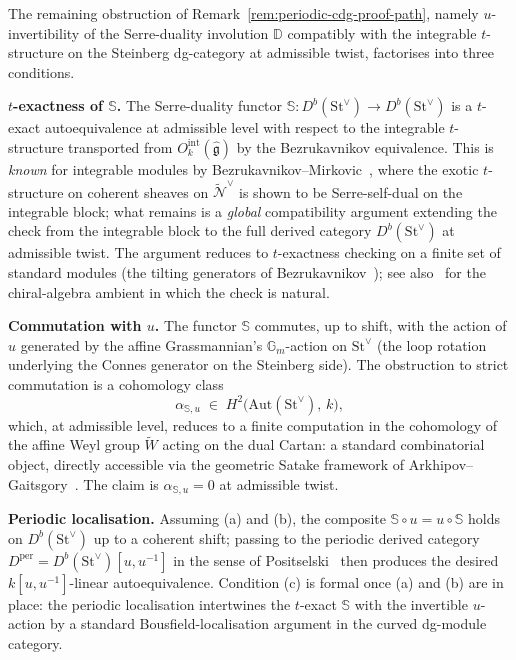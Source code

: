 \begin{remark}
\label{rem:serre-duality-u-invertibility-decomposition}
%
%
The remaining obstruction of
Remark~\textup{\ref{rem:periodic-cdg-proof-path}}, namely $u$-invertibility
of the Serre-duality involution $\mathbb{D}$ compatibly with the
integrable $t$-structure on the Steinberg dg-category at admissible
twist, factorises into three conditions.

\medskip
\noindent\textbf{\(t\)-exactness of \(\mathbb{S}\).}
The Serre-duality functor
$\mathbb{S} \colon D^b(\mathrm{St}^\vee) \to D^b(\mathrm{St}^\vee)$
is a $t$-exact autoequivalence at admissible level with respect to
the integrable $t$-structure transported from
$O^{\mathrm{int}}_k(\widehat{\mathfrak{g}})$ by the Bezrukavnikov
equivalence. This is
\emph{known} for integrable modules by
Bezrukavnikov--Mirkovic~\cite{Bezrukavnikov16}, where the
exotic $t$-structure on coherent sheaves on
$\widetilde{\mathcal{N}}^\vee$ is shown to be Serre-self-dual on the
integrable block; what remains is a \emph{global} compatibility
argument extending the check from the integrable block to the full
derived category $D^b(\mathrm{St}^\vee)$ at admissible twist. The
argument reduces to $t$-exactness checking on a finite set of
standard modules (the tilting generators of
Bezrukavnikov~\cite{Bezrukavnikov16}); see also~\cite{BD04} for the
chiral-algebra ambient in which the check is natural.

\medskip
\noindent\textbf{Commutation with \(u\).}
The functor $\mathbb{S}$ commutes, up to shift, with the action of
$u$ generated by the affine Grassmannian's $\mathbb{G}_m$-action on
$\mathrm{St}^\vee$ (the loop rotation underlying the Connes
generator on the Steinberg side). The obstruction to strict commutation is a
cohomology class
\[
\alpha_{\mathbb{S},u} \;\in\;
H^2\!\bigl(\mathrm{Aut}(\mathrm{St}^\vee),\,k\bigr),
\]
which, at admissible level, reduces to a finite computation in the
cohomology of the affine Weyl group $\widetilde{W}$ acting on the
dual Cartan: a standard combinatorial object, directly accessible
via the geometric Satake framework of
Arkhipov--Gaitsgory~\cite{ArkhipovGaitsgory09}. The claim is
$\alpha_{\mathbb{S},u} = 0$ at admissible twist.

\medskip
\noindent\textbf{Periodic localisation.}
Assuming (a) and (b), the composite $\mathbb{S}\circ u = u\circ\mathbb{S}$
holds on $D^b(\mathrm{St}^\vee)$ up to a coherent shift; passing to
the periodic derived category
$D^{\mathrm{per}} = D^b(\mathrm{St}^\vee)[u,u^{-1}]$ in the sense of
Positselski~\cite{Positselski11,Positselski18} then produces the
desired $k[u,u^{-1}]$-linear autoequivalence. Condition (c) is
formal once (a) and (b) are in place: the periodic localisation
intertwines the $t$-exact $\mathbb{S}$ with the invertible $u$-action
by a standard Bousfield-localisation argument in the curved dg-module
category.


\end{remark}
